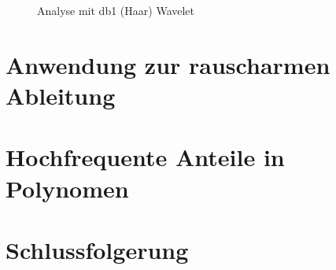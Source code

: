 \begin{refsection}
\begin{figure}
    \centering
    
    \caption{Analyse mit db1 (Haar) Wavelet\label{polynomials:haar}}
\end{figure}

\section{Anwendung zur rauscharmen Ableitung}

\section{Hochfrequente Anteile in Polynomen}

\section{Schlussfolgerung}

\printbibliography[heading=subbibliography]
\end{refsection}
